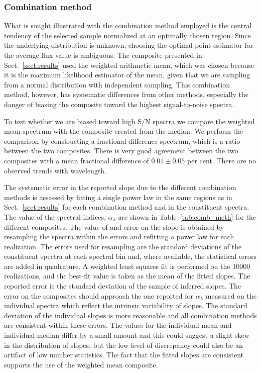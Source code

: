 \documentclass{aa}    %
\newcommand{\Tab}[1]{Table~\ref{tab:#1}}
\newcommand{\tab}[1]{\Tab{#1}}
\newcommand{\sectionname}{Sect.}
\newcommand{\Sect}[1]{\sectionname~\ref{sect:#1}}
\newcommand{\sect}[1]{\Sect{#1}}
\newcommand{\sectlabel}[1]{\label{sect:#1}}
\begin{document}
\subsubsection{Combination method}  \sectlabel{Combination method}
What is sought illustrated with the combination method employed is the central
tendency of the selected sample normalized at an optimally chosen region. Since
the underlying distribution is unknown, choosing the optimal point estimator for
the average flux value is ambiguous. The composite presented in \sect{results}
used the weighted arithmetic mean, which was chosen because it is the maximum
likelihood estimator of the mean, given that we are sampling from a normal
distribution with independent sampling. This combination method, however, has
systematic differences from other methods, especially the danger of biasing the
composite toward the highest signal-to-noise spectra. 

To test whether we are biased toward high S/N spectra we compare the
weighted mean spectrum with the composite created from the median. We
perform the comparison by constructing a fractional difference
spectrum, which is a ratio between the two composites. There is very
good agreement between the two composites with a mean fractional
difference of $0.01 \pm 0.05$ per cent. There are no observed trends with wavelength.

 The systematic error in the reported
slope due to the different combination methods is assessed by fitting
a single power law in the same regions as in \sect{results} for each
combination method and in the constituent spectra. The value of the
spectral indices, $\alpha_\lambda$ are shown in \tab{comb_meth} for the
different composites. The value of and error on the slope is obtained
by resampling the spectra within the errors and refitting a power law for
each realization. The errors used for resampling are the standard
deviations of the constituent spectra at each spectral bin and, where
available, the statistical errors are added in quadrature.
 A weighted least squares fit is performed on the 10000 realizations,
 and the best-fit value is taken as the mean of the fitted slopes. The
 reported error is the standard deviation of the sample of inferred slopes.
 The error on the composites should approach the one reported for
 $\alpha_\lambda$ measured on the individual spectra which reflect the
 intrinsic variability of slopes. The standard deviation of the
 individual slopes is more reasonable and all combination methods are
 consistent within these errors. The values for the individual mean
 and individual median differ by a small amount and this could suggest
 a slight skew in the distribution of slopes, but the low level of
 discrepancy could also be an artifact of low number statistics. The
 fact that the fitted slopes are consistent supports the use of the
 weighted mean composite.
\end{document}

